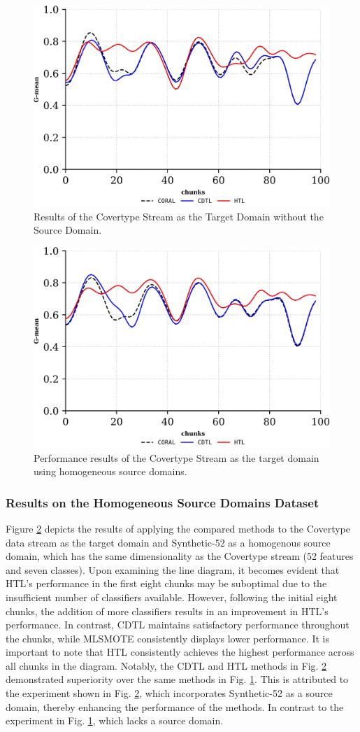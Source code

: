 \begin{figure}[H]
	\centering
	\includegraphics[width=0.6\linewidth]{6_transfer_learning/figures/exp1_0.png}
  \caption{Results of the Covertype Stream as the Target Domain without the Source Domain.}

	\label{fig:6_exp1}
\end{figure}
\begin{figure}[H]
	\centering
	\includegraphics[width=0.6\linewidth]{6_transfer_learning/figures/exp1_1.png}
	\caption{Performance results of the Covertype Stream as the target domain using homogeneous source domains.}

	\label{fig:6_exp2}
\end{figure}

\subsubsection{Results on the Homogeneous Source Domains Dataset}
Figure \ref{fig:6_exp2} depicts the results of applying the compared methods to the Covertype data stream as the target domain and Synthetic-52 as a homogenous source domain, which has the same dimensionality as the Covertype stream (52 features and seven classes). Upon examining the line diagram, it becomes evident that HTL's performance in the first eight chunks may be suboptimal due to the insufficient number of classifiers available. However, following the initial eight chunks, the addition of more classifiers results in an improvement in HTL's performance. In contrast, CDTL maintains satisfactory performance throughout the chunks, while MLSMOTE consistently displays lower performance. It is important to note that HTL consistently achieves the highest performance across all chunks in the diagram. Notably, the CDTL and HTL methods in Fig. \ref{fig:6_exp2} demonstrated superiority over the same methods in Fig. \ref{fig:6_exp1}. This is attributed to the experiment shown in Fig. \ref{fig:6_exp2}, which incorporates Synthetic-52 as a source domain, thereby enhancing the performance of the methods. In contrast to the experiment in Fig. \ref{fig:6_exp1}, which lacks a source domain.


